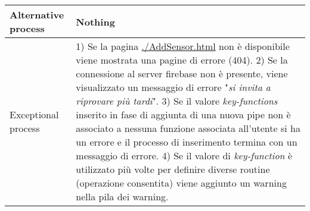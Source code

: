 \documentclass[onecolumn,a4paper]{article}
\begin{document}
\begin{longtable}{|l|p{9.7cm}|}
\hline
Alternative process & Nothing\\
\hline
Exceptional process & 1) Se la pagina \uline{./AddSensor.html} non è disponibile viene mostrata una pagine di errore (404). 2) Se la connessione al server firebase non è presente, viene visualizzato un messaggio di errore "\emph{si invita a riprovare più tardi}". 3) Se il valore \emph{key-functions} inserito in fase di aggiunta di una nuova pipe  non è associato a nessuna funzione associata all'utente si ha un errore e il processo di inserimento termina con un messaggio di errore. 4) Se il valore di \emph{key-function} è utilizzato più volte per definire diverse routine (operazione consentita) viene aggiunto un warning nella pila dei warning.\\
\hline
\end{longtable}
\end{document}
